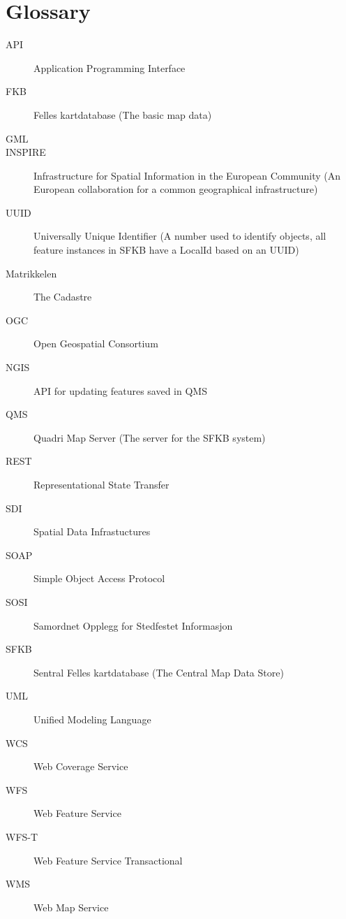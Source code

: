 
\chapter{Glossary}\label{glossary}
\begin{description}
	\item[API] Application Programming Interface
	\item[FKB] Felles kartdatabase (The basic map data)
	\item[GML] 
	\item[INSPIRE] Infrastructure for Spatial Information in the European Community (An European collaboration for a common geographical infrastructure)
	\item[UUID] Universally Unique Identifier (A number used to identify objects, all feature instances in SFKB have a LocalId based on an UUID)
	\item[Matrikkelen] The Cadastre
	\item[OGC] Open Geospatial Consortium
	\item[NGIS] API for updating features saved in QMS
	\item[QMS] Quadri Map Server (The server for the SFKB system)
	\item[REST] Representational State Transfer 
	\item[SDI] Spatial Data Infrastuctures
	\item[SOAP] Simple Object Access Protocol
	\item[SOSI] Samordnet Opplegg for Stedfestet Informasjon
	\item[SFKB] Sentral Felles kartdatabase (The Central Map Data Store)
	\item[UML] Unified Modeling Language
	\item[WCS] Web Coverage Service
	\item[WFS] Web Feature Service
	\item[WFS-T] Web Feature Service Transactional
	\item[WMS] Web Map Service
\end{description}
